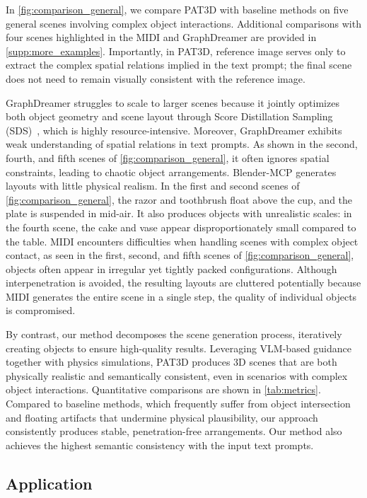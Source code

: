 In \autoref{fig:comparison_general}, we compare PAT3D with baseline methods on five general scenes involving complex object interactions. Additional comparisons with four scenes highlighted in the MIDI and GraphDreamer are provided in \autoref{supp:more_examples}. Importantly, in PAT3D, reference image serves only to extract the complex spatial relations implied in the text prompt; the final scene does not need to remain visually consistent with the reference image. 

GraphDreamer struggles to scale to larger scenes because it jointly optimizes both object geometry and scene layout through Score Distillation Sampling (SDS)~\cite{poole2022dreamfusion}, which is highly resource-intensive. Moreover, GraphDreamer exhibits weak understanding of spatial relations in text prompts. As shown in the second, fourth, and fifth scenes of \autoref{fig:comparison_general}, it often ignores spatial constraints, leading to chaotic object arrangements. Blender-MCP generates layouts with little physical realism. In the first and second scenes of \autoref{fig:comparison_general}, the razor and toothbrush float above the cup, and the plate is suspended in mid-air. It also produces objects with unrealistic scales: in the fourth scene, the cake and vase appear disproportionately small compared to the table. MIDI encounters difficulties when handling scenes with complex object contact, as seen in the first, second, and fifth scenes of \autoref{fig:comparison_general}, objects often appear in irregular yet tightly packed configurations. Although interpenetration is avoided, the resulting layouts are cluttered potentially because MIDI generates the entire scene in a single step, the quality of individual objects is compromised.

By contrast, our method decomposes the scene generation process, iteratively creating objects to ensure high-quality results. Leveraging VLM-based guidance together with physics simulations, PAT3D produces 3D scenes that are both physically realistic and semantically consistent, even in scenarios with complex object interactions. Quantitative comparisons are shown in \autoref{tab:metrics}. Compared to baseline methods, which frequently suffer from object intersection and floating artifacts that undermine physical plausibility, our approach consistently produces stable, penetration-free arrangements. Our method also achieves the highest semantic consistency with the input text prompts.

\subsection{Application}


